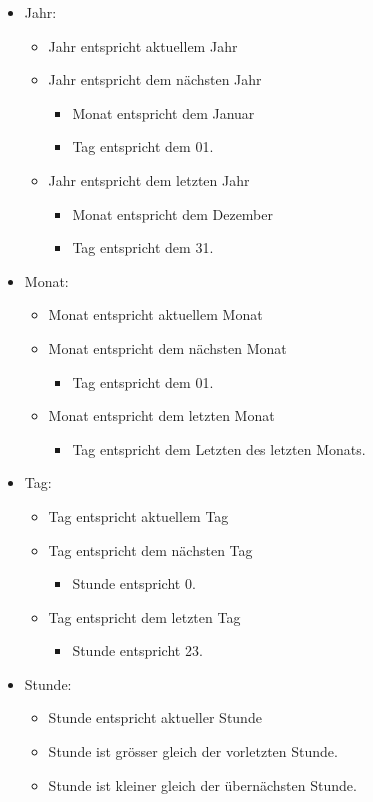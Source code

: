 \begin{itemize}
\item Jahr: 
	\begin{itemize}
		\item Jahr entspricht aktuellem Jahr
		\item Jahr entspricht dem nächsten Jahr
			\begin{itemize}
				\item Monat entspricht dem Januar
				\item Tag entspricht dem 01.
			\end{itemize}
		\item Jahr entspricht dem letzten Jahr
			\begin{itemize}
				\item Monat entspricht dem Dezember
				\item Tag entspricht dem 31.
			\end{itemize}
	\end{itemize}
\item Monat:
	\begin{itemize}
		\item Monat entspricht aktuellem Monat
		\item Monat entspricht dem nächsten Monat
			\begin{itemize}
				\item Tag entspricht dem 01.
			\end{itemize}
		\item Monat entspricht dem letzten Monat
			\begin{itemize}
				\item Tag entspricht dem Letzten des letzten Monats.
			\end{itemize}
	\end{itemize}
\item Tag:
\begin{itemize}
	\item Tag entspricht aktuellem Tag
	\item Tag entspricht dem nächsten Tag
		\begin{itemize}
			\item Stunde entspricht 0.
		\end{itemize}
	\item Tag entspricht dem letzten Tag
		\begin{itemize}
			\item Stunde entspricht 23.
		\end{itemize}
\end{itemize}
\item Stunde:
	\begin{itemize}
		\item Stunde entspricht aktueller Stunde
		\item Stunde ist grösser gleich der vorletzten Stunde.
		\item Stunde ist kleiner gleich der übernächsten Stunde.
	\end{itemize}
\end{itemize}

